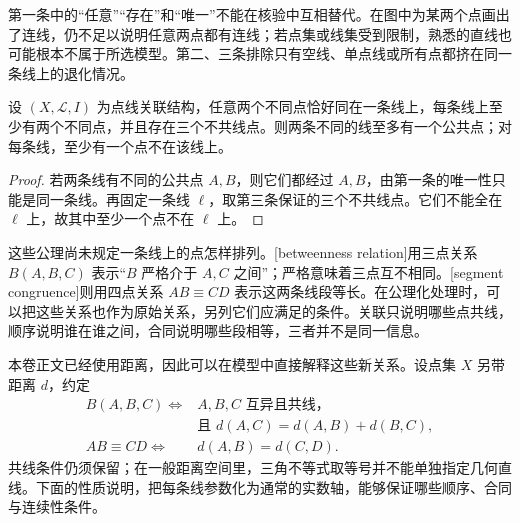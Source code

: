 第一条中的“任意”“存在”和“唯一”不能在核验中互相替代。在图中为某两个点画出了连线，仍不足以说明任意两点都有连线；若点集或线集受到限制，熟悉的直线也可能根本不属于所选模型。第二、三条排除只有空线、单点线或所有点都挤在同一条线上的退化情况。

\begin{proposition}
	\label{g1:prop:incidence-intersection}
	设 \((X,\mathcal L,I)\) 为点线关联结构，任意两个不同点恰好同在一条线上，每条线上至少有两个不同点，并且存在三个不共线点。则两条不同的线至多有一个公共点；对每条线，至少有一个点不在该线上。
\end{proposition}
\begin{proof}
	若两条线有不同的公共点 \(A,B\)，则它们都经过 \(A,B\)，由第一条的唯一性只能是同一条线。再固定一条线 \(\ell\)，取第三条保证的三个不共线点。它们不能全在 \(\ell\) 上，故其中至少一个点不在 \(\ell\) 上。
\end{proof}

这些公理尚未规定一条线上的点怎样排列。[betweenness relation]用三点关系 \(B(A,B,C)\) 表示“\(B\) 严格介于 \(A,C\) 之间”；严格意味着三点互不相同。[segment congruence]则用四点关系 \(AB\equiv CD\) 表示这两条线段等长。在公理化处理时，可以把这些关系也作为原始关系，另列它们应满足的条件。关联只说明哪些点共线，顺序说明谁在谁之间，合同说明哪些段相等，三者并不是同一信息。

\ProseParagraphBreak

本卷正文已经使用距离，因此可以在模型中直接解释这些新关系。设点集 \(X\) 另带距离 \(d\)，约定
\[
	\begin{aligned}
		B(A,B,C)\iff{}& A,B,C\text{ 互异且共线，}\\
		&\text{且 }d(A,C)=d(A,B)+d(B,C),\\
		AB\equiv CD\iff{}& d(A,B)=d(C,D).
	\end{aligned}
\]
共线条件仍须保留；在一般距离空间里，三角不等式取等号并不能单独指定几何直线。下面的性质说明，把每条线参数化为通常的实数轴，能够保证哪些顺序、合同与连续性条件。

